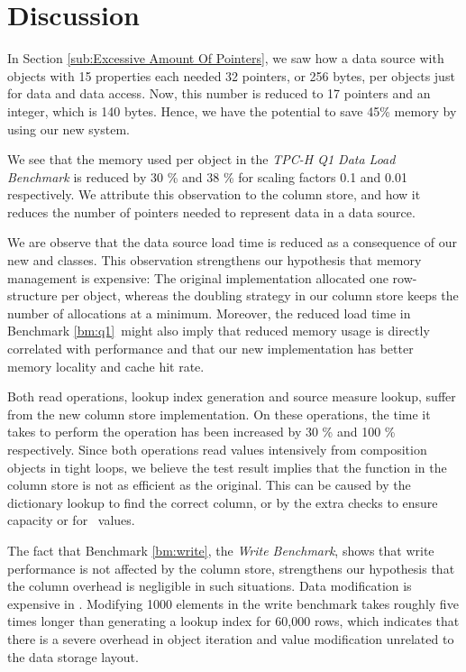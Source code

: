 \section{Discussion}
\label{sec:Discussion}
In Section \ref{sub:Excessive Amount Of Pointers}, we saw how a data source with objects with 15 properties each needed 32 pointers, or 256 bytes, per objects just for data and data access. Now, this number is reduced to 17 pointers and an integer, which is 140 bytes. Hence, we have the potential to save 45\% memory by using our new system.

We see that the memory used per object in the \textit{TPC-H Q1 Data Load Benchmark} is reduced by 30 \% and 38 \% for scaling factors 0.1 and 0.01 respectively. We attribute this observation to the column store, and how it reduces the number of pointers needed to represent data in a data source. 

We are observe that the data source load time is reduced as a consequence of our new  and  classes. This observation strengthens our hypothesis that memory management is expensive: The original implementation allocated one row-structure per object, whereas the doubling strategy in our column store keeps the number of allocations at a minimum. Moreover, the reduced load time in Benchmark \ref{bm:q1}~might also imply that reduced memory usage is directly correlated with performance and that our new implementation has better memory locality and cache hit rate.

Both read operations, lookup index generation and source measure lookup, suffer from the new column store implementation. On these operations, the time it takes to perform the operation has been increased by 30 \% and 100 \% respectively. Since both operations read values intensively from composition objects in tight loops, we believe the test result implies that the  function in the column store is not as efficient as the original. This can be caused by the dictionary lookup to find the correct column, or by the extra checks to ensure capacity or for \nil~values.

The fact that Benchmark \ref{bm:write}, the \textit{Write Benchmark}, shows that write performance is not affected by the column store, strengthens our hypothesis that the column overhead is negligible in such situations. Data modification is expensive in \gap. Modifying 1000 elements in the write benchmark takes roughly five times longer than generating a lookup index for 60,000 rows, which indicates that there is a severe overhead in object iteration and value modification unrelated to the data storage layout.

